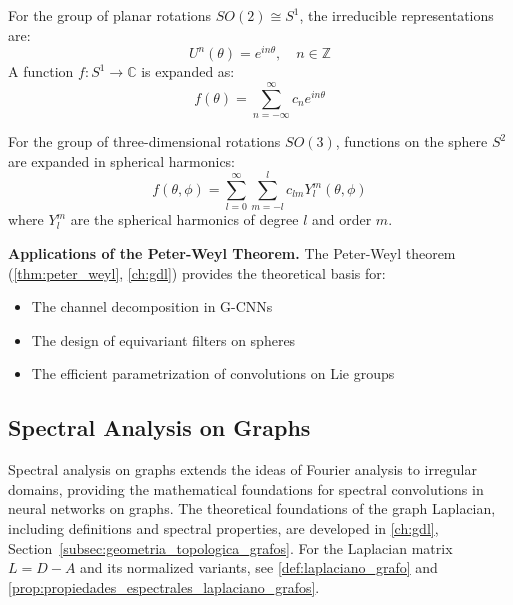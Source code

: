 \begin{definition}\label{def:armonicos_circulares}
For the group of planar rotations $SO(2) \cong S^1$, the irreducible representations are:
\begin{equation}
U^n(\theta) = e^{in\theta}, \quad n \in \mathbb{Z}
\end{equation}
A function $f: S^1 \to \mathbb{C}$ is expanded as:
\begin{equation}
f(\theta) = \sum_{n=-\infty}^{\infty} c_n e^{in\theta}
\end{equation}
\end{definition}

\begin{definition}\label{def:armonicos_esfericos}
For the group of three-dimensional rotations $SO(3)$, functions on the sphere $S^2$ are expanded in spherical harmonics:
\begin{equation}
f(\theta, \phi) = \sum_{l=0}^{\infty} \sum_{m=-l}^{l} c_{lm} Y_l^m(\theta, \phi)
\end{equation}
where $Y_l^m$ are the spherical harmonics of degree $l$ and order $m$.
\end{definition}

\textbf{Applications of the Peter-Weyl Theorem.} The Peter-Weyl theorem (\autoref{thm:peter_weyl}, \autoref{ch:gdl}) provides the theoretical basis for:
\begin{itemize}
    \item The channel decomposition in G-CNNs
    \item The design of equivariant filters on spheres
    \item The efficient parametrization of convolutions on Lie groups
\end{itemize}

\subsection{Spectral Analysis on Graphs}\label{subsec:analisis_espectral_grafos}

Spectral analysis on graphs extends the ideas of Fourier analysis to irregular domains, providing the mathematical foundations for spectral convolutions in neural networks on graphs. The theoretical foundations of the graph Laplacian, including definitions and spectral properties, are developed in \autoref{ch:gdl}, Section~\ref{subsec:geometria_topologica_grafos}. For the Laplacian matrix $L = D - A$ and its normalized variants, see \autoref{def:laplaciano_grafo} and \autoref{prop:propiedades_espectrales_laplaciano_grafos}.

